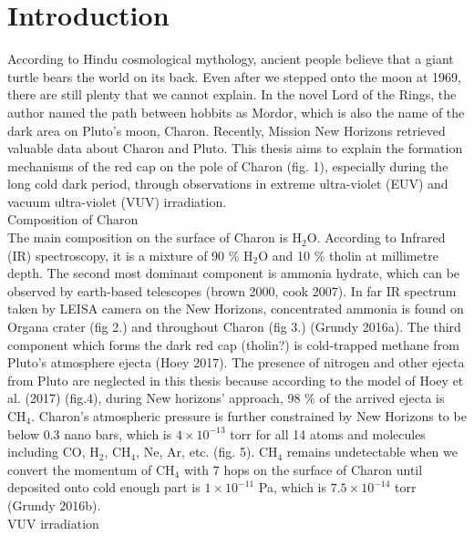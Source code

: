 \chapter{Introduction}


According to Hindu cosmological mythology, ancient people believe that a giant turtle bears the world on its back. Even after we stepped onto the moon at 1969, there are still plenty that we cannot explain. In the novel Lord of the Rings, the author named the path between hobbits as Mordor, which is also the name of the dark area on Pluto’s moon, Charon. Recently, Mission New Horizons retrieved valuable data about Charon and Pluto. This thesis aims to explain the formation mechanisms of the red cap on the pole of Charon (fig. 1), especially during the long cold dark period, through observations in extreme ultra-violet (EUV) and vacuum ultra-violet (VUV) irradiation.\\
Composition of Charon\\
The main composition on the surface of Charon is H$_2$O. According to Infrared (IR) spectroscopy, it is a mixture of 90 \% H$_2$O and 10 \% tholin at millimetre depth. The second most dominant component is ammonia hydrate, which can be observed by earth-based telescopes (brown 2000, cook 2007). In far IR spectrum taken by LEISA camera on the New Horizons, concentrated ammonia is found on Organa crater (fig 2.) and throughout Charon (fig 3.) (Grundy 2016a). The third component which forms the dark red cap (tholin?) is cold-trapped methane from Pluto’s atmosphere ejecta (Hoey 2017). The presence of nitrogen and other ejecta from Pluto are neglected in this thesis because according to the model of Hoey et al. (2017) (fig.4), during New horizons’ approach, 98 \% of the arrived ejecta is CH$_4$. Charon’s atmospheric pressure is further constrained by New Horizons to be below 0.3 nano bars, which is $4 \times 10^{-13}$ torr for all 14 atoms and molecules including CO, H$_2$, CH$_4$, Ne, Ar, etc. (fig. 5). CH$_4$ remains undetectable when we convert the momentum of CH$_4$ with 7 hops on the surface of Charon until deposited onto cold enough part is $1 \times 10^{-11}$ Pa, which is $7.5 \times 10^{-14}$ torr (Grundy 2016b).\\
VUV irradiation\\
